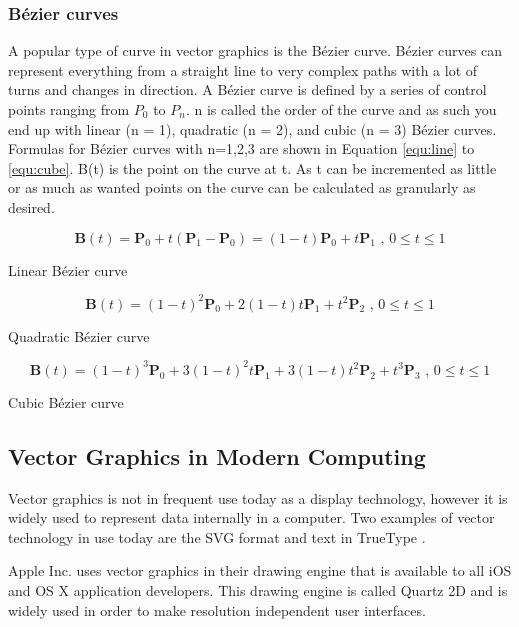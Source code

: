 \subsubsection{Bézier curves}
\label{sec:bezier}
A popular type of curve in vector graphics is the Bézier curve.
Bézier curves can represent everything from a straight line to very complex paths with a lot of turns and changes in direction.
A Bézier curve is defined by a series of control points ranging from \(P_0\) to \(P_n\).
n is called the order of the curve and as such you end up with linear (n = 1), quadratic (n = 2), and cubic (n = 3) Bézier curves.
Formulas for Bézier curves with n=1,2,3 are shown in Equation \ref{equ:line} to \ref{equ:cube}.
B(t) is the point on the curve at t.
As t can be incremented as little or as much as wanted points on the curve can be calculated as granularly as desired.

\begin{cequation}[H]
	\begin{equation}
	    \label{equ:line}
		\mathbf{B}(t)=\mathbf{P}_0 + t(\mathbf{P}_1-\mathbf{P}_0)=(1-t)\mathbf{P}_0 + t\mathbf{P}_1 \mbox{ , } 0 \le t \le 1
	\end{equation}
	\caption{Linear Bézier curve}
\end{cequation}

\begin{cequation}[H]
	\begin{equation}
		\mathbf{B}(t) = (1 - t)^{2}\mathbf{P}_0 + 2(1 - t)t\mathbf{P}_1 + t^{2}\mathbf{P}_2 \mbox{ , } 0 \le t \le 1
	\end{equation}
	\caption{Quadratic Bézier curve}
\end{cequation}

\begin{cequation}[H]
	\begin{equation}
	    \label{equ:cube}
		\mathbf{B}(t)=(1-t)^3\mathbf{P}_0+3(1-t)^2t\mathbf{P}_1+3(1-t)t^2\mathbf{P}_2+t^3\mathbf{P}_3 \mbox{ , } 0 \le t \le 1
	\end{equation}
	\caption{Cubic Bézier curve}
\end{cequation}

\subsection{Vector Graphics in Modern Computing}

Vector graphics is not in frequent use today as a display technology, however it is widely used to represent data internally in a computer.
Two examples of vector technology in use today are the SVG format and text in TrueType \cite{truetype}.

Apple Inc. \cite{apple} uses vector graphics in their drawing engine that is available to all iOS and OS X application developers.
This drawing engine is called Quartz 2D \cite{quartz2d} and is widely used in order to make resolution independent user interfaces.
